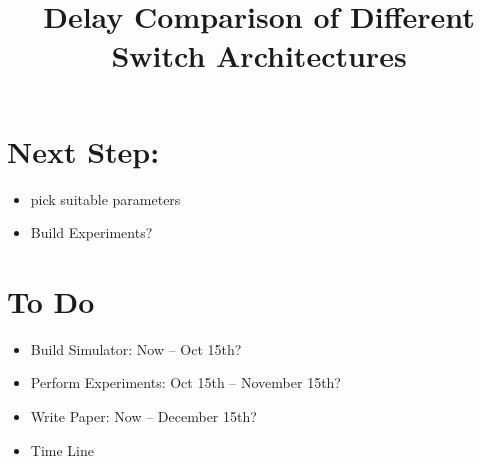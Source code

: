 \documentclass{IEEEtran}%
\begin{document}
\title{Delay Comparison of Different Switch Architectures}



\author{}




\maketitle

\section{Next Step:}
\begin{itemize}
\item pick suitable parameters
\item Build Experiments?
\end{itemize}
\section{To Do}
\begin{itemize}
\item Build Simulator: Now -- Oct 15th?
\item Perform Experiments: Oct 15th -- November 15th?
\item Write Paper: Now -- December 15th?
\item Time Line
\end{itemize}
\end{document}
